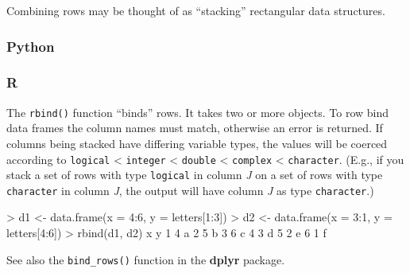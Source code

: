 \documentclass[
]{book}
\newenvironment{Shaded}{\begin{snugshade}}{\end{snugshade}}
\newcommand{\AttributeTok}[1]{\textcolor[rgb]{0.77,0.63,0.00}{#1}}
\newcommand{\DecValTok}[1]{\textcolor[rgb]{0.00,0.00,0.81}{#1}}
\newcommand{\FunctionTok}[1]{\textcolor[rgb]{0.00,0.00,0.00}{#1}}
\newcommand{\NormalTok}[1]{#1}
\newcommand{\OtherTok}[1]{\textcolor[rgb]{0.56,0.35,0.01}{#1}}
\newcommand{\SpecialCharTok}[1]{\textcolor[rgb]{0.00,0.00,0.00}{#1}}
\begin{document}
Combining rows may be thought of as ``stacking'' rectangular data structures.

\hypertarget{python-23}{%
\subsubsection*{Python}\label{python-23}}

\hypertarget{r-23}{%
\subsubsection*{R}\label{r-23}}

The \texttt{rbind()} function ``binds'' rows. It takes two or more objects. To row bind data frames the column names must match, otherwise an error is returned. If columns being stacked have differing variable types, the values will be coerced according to \texttt{logical} \textless{} \texttt{integer} \textless{} \texttt{double} \textless{} \texttt{complex} \textless{} \texttt{character}. (E.g., if you stack a set of rows with type \texttt{logical} in column \emph{J} on a set of rows with type \texttt{character} in column \emph{J}, the output will have column \emph{J} as type \texttt{character}.)

\begin{Shaded}
\begin{Highlighting}[]
\SpecialCharTok{\textgreater{}}\NormalTok{ d1 }\OtherTok{\textless{}{-}} \FunctionTok{data.frame}\NormalTok{(}\AttributeTok{x =} \DecValTok{4}\SpecialCharTok{:}\DecValTok{6}\NormalTok{, }\AttributeTok{y =}\NormalTok{ letters[}\DecValTok{1}\SpecialCharTok{:}\DecValTok{3}\NormalTok{])}
\SpecialCharTok{\textgreater{}}\NormalTok{ d2 }\OtherTok{\textless{}{-}} \FunctionTok{data.frame}\NormalTok{(}\AttributeTok{x =} \DecValTok{3}\SpecialCharTok{:}\DecValTok{1}\NormalTok{, }\AttributeTok{y =}\NormalTok{ letters[}\DecValTok{4}\SpecialCharTok{:}\DecValTok{6}\NormalTok{])}
\SpecialCharTok{\textgreater{}} \FunctionTok{rbind}\NormalTok{(d1, d2)}
\NormalTok{  x y}
\DecValTok{1} \DecValTok{4}\NormalTok{ a}
\DecValTok{2} \DecValTok{5}\NormalTok{ b}
\DecValTok{3} \DecValTok{6}\NormalTok{ c}
\DecValTok{4} \DecValTok{3}\NormalTok{ d}
\DecValTok{5} \DecValTok{2}\NormalTok{ e}
\DecValTok{6} \DecValTok{1}\NormalTok{ f}
\end{Highlighting}
\end{Shaded}

See also the \texttt{bind\_rows()} function in the \textbf{dplyr} package.
\end{document}
